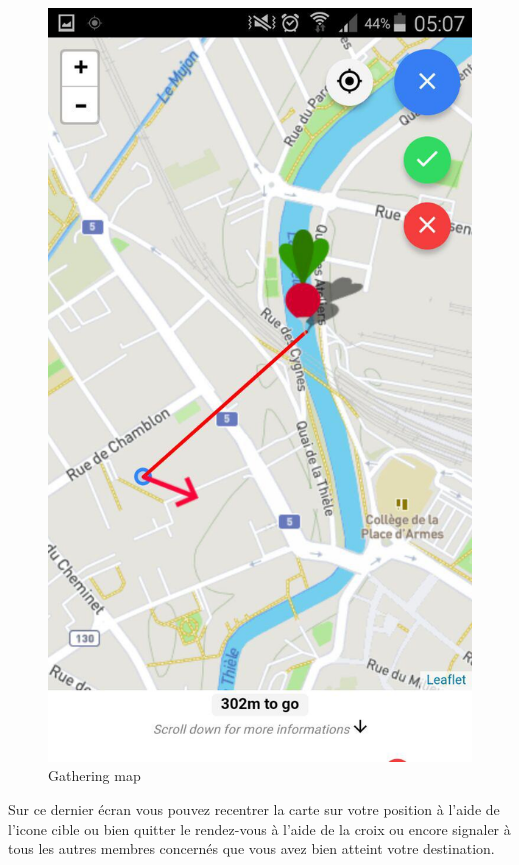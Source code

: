\documentclass[french]{article}
\begin{document}
	\begin{figure}[H]
		\centering
		\includegraphics{../screenshot/screenshot-map}
		\caption{Gathering map}
		\label{Gathering map}
	\end{figure} 
	Sur ce dernier écran vous pouvez recentrer la carte sur votre position à l'aide de l'icone cible ou bien quitter le rendez-vous à l'aide de la croix ou encore signaler à tous les autres membres concernés que vous avez bien atteint votre destination.
		
	
\end{document}
